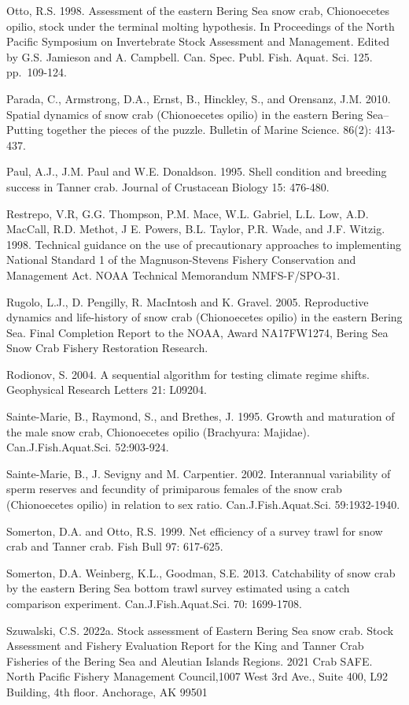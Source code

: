 \documentclass[
]{article}
\begin{document}
Otto, R.S. 1998. Assessment of the eastern Bering Sea snow crab, Chionoecetes opilio, stock under the terminal molting hypothesis. In Proceedings of the North Pacific Symposium on Invertebrate Stock Assessment and Management. Edited by G.S. Jamieson and A. Campbell. Can. Spec. Publ. Fish. Aquat. Sci. 125. pp.~109-124.

Parada, C., Armstrong, D.A., Ernst, B., Hinckley, S., and Orensanz, J.M. 2010. Spatial dynamics of snow crab (Chionoecetes opilio) in the eastern Bering Sea--Putting together the pieces of the puzzle. Bulletin of Marine Science. 86(2): 413-437.

Paul, A.J., J.M. Paul and W.E. Donaldson. 1995. Shell condition and breeding success in Tanner crab. Journal of Crustacean Biology 15: 476-480.

Restrepo, V.R, G.G. Thompson, P.M. Mace, W.L. Gabriel, L.L. Low, A.D. MacCall, R.D. Methot, J E. Powers, B.L. Taylor, P.R. Wade, and J.F. Witzig. 1998. Technical guidance on the use of precautionary approaches to implementing National Standard 1 of the Magnuson-Stevens Fishery Conservation and Management Act. NOAA Technical Memorandum NMFS-F/SPO-31.

Rugolo, L.J., D. Pengilly, R. MacIntosh and K. Gravel. 2005. Reproductive dynamics and life-history of snow crab (Chionoecetes opilio) in the eastern Bering Sea. Final Completion Report to the NOAA, Award NA17FW1274, Bering Sea Snow Crab Fishery Restoration Research.

Rodionov, S. 2004. A sequential algorithm for testing climate regime shifts. Geophysical Research Letters 21: L09204.

Sainte-Marie, B., Raymond, S., and Brethes, J. 1995. Growth and maturation of the male snow crab, Chionoecetes opilio (Brachyura: Majidae). Can.J.Fish.Aquat.Sci. 52:903-924.

Sainte-Marie, B., J. Sevigny and M. Carpentier. 2002. Interannual variability of sperm reserves and fecundity of primiparous females of the snow crab (Chionoecetes opilio) in relation to sex ratio. Can.J.Fish.Aquat.Sci. 59:1932-1940.

Somerton, D.A. and Otto, R.S. 1999. Net efficiency of a survey trawl for snow crab and Tanner crab. Fish Bull 97: 617-625.

Somerton, D.A. Weinberg, K.L., Goodman, S.E. 2013. Catchability of snow crab by the eastern Bering Sea bottom trawl survey estimated using a catch comparison experiment. Can.J.Fish.Aquat.Sci. 70: 1699-1708.

Szuwalski, C.S. 2022a. Stock assessment of Eastern Bering Sea snow crab. Stock Assessment and Fishery Evaluation Report for the King and Tanner Crab Fisheries of the Bering Sea and Aleutian Islands Regions. 2021 Crab SAFE. North Pacific Fishery Management Council,1007 West 3rd Ave., Suite 400, L92 Building, 4th floor. Anchorage, AK 99501
\end{document}
